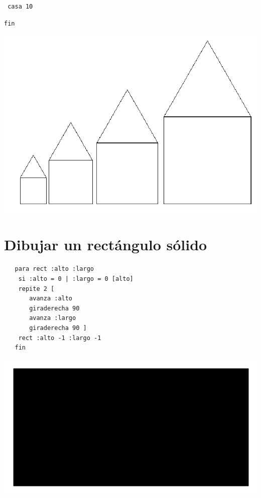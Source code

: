\noindent \texttt{ casa 10}

\noindent \texttt{fin}
\begin{center}
   \includegraphics[scale=0.4]{Imagenes/13_Ejemplos/casas.png}
\end{center}

\section{Dibujar un rect\'angulo s\'olido}
   \label{Dib-Rectangulo-Solido}

\begin{verbatim}
   para rect :alto :largo
    si :alto = 0 | :largo = 0 [alto]
    repite 2 [
       avanza :alto
       giraderecha 90
       avanza :largo
       giraderecha 90 ]
    rect :alto -1 :largo -1
   fin \end{verbatim}
\begin{center}
   \includegraphics[scale=0.6]{Imagenes/13_Ejemplos/rectangulo.png}
\end{center}

